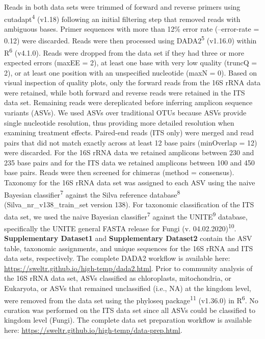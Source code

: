 \documentclass[
  10pt,
  letterpaper,
  DIV=11,
  numbers=noendperiod]{scrartcl}
\begin{document}
Reads in both data sets were trimmed of forward and reverse primers
using cutadapt\textsuperscript{4} (v1.18) following an initial filtering
step that removed reads with ambiguous bases. Primer sequences with more
than 12\% error rate (--error-rate = 0.12) were discarded. Reads were
then processed using DADA2\textsuperscript{5} (v1.16.0) within
R\textsuperscript{6} (v4.1.0). Reads were dropped from the data set if
they had three or more expected errors (maxEE = 2), at least one base
with very low quality (truncQ = 2), or at least one position with an
unspecified nucleotide (maxN = 0). Based on visual inspection of quality
plots, only the forward reads from the 16S rRNA data were retained,
while both forward and reverse reads were retained in the ITS data set.
Remaining reads were dereplicated before inferring amplicon sequence
variants (ASVs). We used ASVs over traditional OTUs because ASVs provide
single nucleotide resolution, thus providing more detailed resolution
when examining treatment effects. Paired-end reads (ITS only) were
merged and read pairs that did not match exactly across at least 12 base
pairs (minOverlap = 12) were discarded. For the 16S rRNA data we
retained amplicons between 230 and 235 base pairs and for the ITS data
we retained amplicons between 100 and 450 base pairs. Reads were then
screened for chimeras (method = consensus). Taxonomy for the 16S rRNA
data set was assigned to each ASV using the naive Bayesian
classifier\textsuperscript{7} against the Silva reference
database\textsuperscript{8} (Silva\_nr\_v138\_train\_set version 138).
For taxonomic classification of the ITS data set, we used the naive
Bayesian classifier\textsuperscript{7} against the
UNITE\textsuperscript{9} database, specifically the UNITE general FASTA
release for Fungi (v. 04.02.2020)\textsuperscript{10}.
\textbf{Supplementary Dataset1} and \textbf{Supplementary Dataset2}
contain the ASV table, taxonomic assignments, and unique sequences for
the 16S rRNA and ITS data sets, respectively. The complete DADA2
workflow is available here:
\url{https://sweltr.github.io/high-temp/dada2.html}. Prior to community
analysis of the 16S rRNA data set, ASVs classified as chloroplasts,
mitochondria, or Eukaryota, or ASVs that remained unclassified (i.e.,
NA) at the kingdom level, were removed from the data set using the
phyloseq package\textsuperscript{11} (v1.36.0) in R\textsuperscript{6}.
No curation was performed on the ITS data set since all ASVs could be
classified to kingdom level (Fungi). The complete data set preparation
workflow is available here:
\url{https://sweltr.github.io/high-temp/data-prep.html}.
\end{document}
